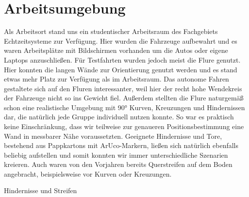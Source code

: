 \section{Arbeitsumgebung}
\label{sec:arbeitsumgebung}
Als Arbeitsort stand uns ein studentischer Arbeitsraum des Fachgebiets Echtzeitsysteme zur Verfügung. Hier wurden die Fahrzeuge aufbewahrt und es waren Arbeitsplätze mit Bildschirmen vorhanden um die Autos oder eigene Laptops anzuschließen. 
\newline
Für Testfahrten wurden jedoch meist die Flure genutzt. Hier konnten die langen Wände zur Orientierung genutzt werden und es stand etwas mehr Platz zur Verfügung als im Arbeitsraum. Das autonome Fahren gestaltete sich auf den Fluren interessanter, weil hier der recht hohe Wendekreis der Fahrzeuge nicht so ins Gewicht fiel. Außerdem stellten die Flure naturgemäß schon eine realistische Umgebung mit 90° Kurven, Kreuzungen und Hindernissen dar, die natürlich jede Gruppe individuell nutzen konnte. So war es praktisch keine Einschränkung, dass wir teilweise zur genaueren Positionsbestimmung eine Wand in messbarer Nähe voraussetzten. Geeignete Hindernisse und Tore, bestehend aus Pappkartons mit ArUco-Markern, ließen sich natürlich ebenfalls beliebig aufstellen und somit konnten wir immer unterschiedliche Szenarien kreieren. Auch waren von den Vorjahren bereits Querstreifen auf dem Boden angebracht, beispielsweise vor Kurven oder Kreuzungen.



Hindernisse und Streifen